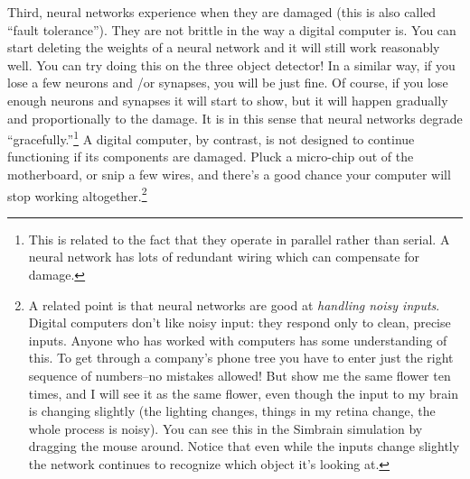 
Third, neural networks experience  when they are damaged (this is also called ``fault tolerance''). They are not brittle in the way a digital computer is. You can start deleting the weights of a neural network and it will still work reasonably well. You can try doing this on the three object detector!   In a  similar way, if you lose a few neurons and /or synapses, you will be just fine. Of course, if you lose enough neurons and synapses it will start to show, but it will happen gradually and  proportionally to the damage. It is in this sense that neural networks degrade ``gracefully.''\footnote{This is related to the fact that they operate in parallel rather than serial. A neural network has lots of redundant wiring which can compensate for damage.}  A digital computer, by contrast, is not designed to continue functioning if its components are damaged. Pluck a micro-chip out of the motherboard, or snip a few wires, and there's a good chance your computer will stop working altogether.\footnote{A related point is that neural networks are good at \emph{handling noisy inputs}. Digital computers don't like noisy input: they respond only to clean, precise inputs. Anyone who has worked with computers has some understanding of this. To get through a company's phone tree you have to enter just the right sequence of numbers--no mistakes allowed!  But show me the same flower ten times, and I will see it as the same flower, even though the input to my brain is changing slightly (the lighting changes, things in my retina change, the whole process is noisy). You can see this in the Simbrain simulation by dragging the mouse around. Notice that even while the inputs change slightly the network continues to recognize which object it's looking at.}

